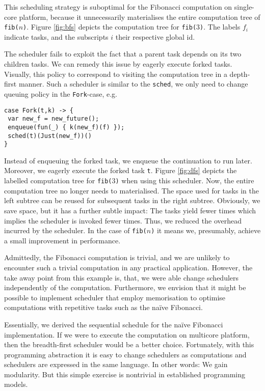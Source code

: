 \documentclass[preprint,10pt,numbers]{sigplanconf}
\begin{document}
This scheduling strategy is suboptimal for the Fibonacci computation on single-core platform, because it unnecessarily materialises the entire computation tree of \texttt{fib($n$)}. Figure \ref{fig:bfs} depicts the computation tree for \texttt{fib($3$)}. The labels $f_i$ indicate tasks, and the subscripts $i$ their respective global id.

The scheduler fails to exploit the fact that a parent task depends on its two children tasks. We can remedy this issue by eagerly execute forked tasks. Visually, this policy to correspond to visiting the computation tree in a depth-first manner. Such a scheduler is similar to the \texttt{sched}, we only need to change queuing policy in the \texttt{Fork}-case, e.g.
\begin{lstlisting}[style={links},caption={}]
case Fork(t,k) -> {
 var new_f = new_future();
 enqueue(fun(_) { k(new_f)(f) });
 sched(t)(Just(new_f))()
}
\end{lstlisting}
Instead of enqueuing the forked task, we enqueue the continuation to run later. Moreover, we eagerly execute the forked task \texttt{t}.
Figure \ref{fig:dfs} depicts the labelled computation tree for \texttt{fib($3$)} when using this scheduler. Now, the entire computation tree no longer needs to materialised. The space used for tasks in the left subtree can be reused for subsequent tasks in the right subtree. Obviously, we save space, but it has a further subtle impact: The tasks yield fewer times which implies the scheduler is invoked fewer times. Thus, we reduced the overhead incurred by the scheduler. In the case of \texttt{fib($n$)} it means we, presumably, achieve a small improvement in performance.

Admittedly, the Fibonacci computation is trivial, and we are unlikely to encounter such a trivial computation in any practical application. However, the take away point from this example is, that, we were able change schedulers independently of the computation. Furthermore, we envision that it might be possible to implement scheduler that employ memorisation to optimise computations with repetitive tasks such as the naïve Fibonacci.

Essentially, we derived the sequential schedule for the naïve Fibonacci implementation. If we were to execute the computation on multicore platform, then the breadth-first scheduler would be a better choice. Fortunately, with this programming abstraction it is easy to change schedulers as computations and schedulers are expressed in the same language. In other words: We gain modularity. But this simple exercise is nontrivial in established programming models.
\end{document}

